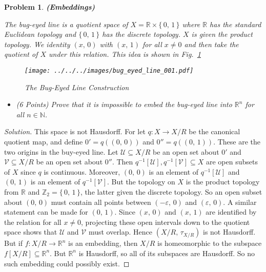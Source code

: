\documentclass{article}
\theoremstyle{normal}
\newtheorem{problem}{Problem}
\begin{document}
    \newpage
    \color{blue}
    \begin{problem}
        \textbf{(Embeddings)}
        \par\hfill\par
        The bug-eyed line is a quotient space of
        $X=\mathbb{R}\times\{\,0,\,1\,\}$ where $\mathbb{R}$ has the standard
        Euclidean topology and $\{\,0,\,1\,\}$ has the discrete topology. $X$
        is given the product topology. We identity
        $(x,\,0)$ with $(x,\,1)$ for all $x\ne{0}$ and then take the quotient
        of $X$ under this relation. This idea is shown in
        Fig.~\ref{fig:bug_eyed_line}
        \begin{figure}
            \centering
            \texttt{[image: ../../../images/bug\_eyed\_line\_001.pdf]}
            \caption{The Bug-Eyed Line Construction}
            \label{fig:bug_eyed_line}
        \end{figure}
        \begin{itemize}
            \item (6 Points) Prove that it is impossible to embed
            the bug-eyed line into $\mathbb{R}^{n}$ for all $n\in\mathbb{N}$.
        \end{itemize}
    \end{problem}
    \color{black}
    \begin{proof}[Solution]
        This space is not Hausdorff. For let $q:X\rightarrow{X}/R$ be the
        canonical quotient map, and define $0'=q((0,\,0))$ and
        $0''=q((0,\,1))$. These are the two origins in the buy-eyed line.
        Let $\mathcal{U}\subseteq{X}/R$ be an open set about $0'$ and
        $\mathcal{V}\subseteq{X}/R$ be an open set about $0''$. Then
        $q^{-1}[\mathcal{U}],q^{-1}[\mathcal{V}]\subseteq{X}$ are open
        subsets of $X$ since $q$ is continuous. Moreover, $(0,\,0)$ is an
        element of $q^{-1}[\mathcal{U}]$ and $(0,\,1)$ is an element of
        $q^{-1}[\mathcal{V}]$. But the topology on $X$ is the product topology
        from $\mathbb{R}$ and $\mathbb{Z}_{2}=\{\,0,\,1\,\}$, the latter given
        the discrete topology. So an open subset about
        $(0,\,0)$ must contain all points between $(-\varepsilon,\,0)$ and
        $(\varepsilon,\,0)$. A similar statement can be made for
        $(0,\,1)$. Since $(x,\,0)$ and $(x,\,1)$ are identified by the relation
        for all $x\ne{0}$, projecting these open intervals down to the quotient
        space shows that $\mathcal{U}$ and $\mathcal{V}$ must overlap.
        Hence $(X/R,\,\tau_{X/R})$ is not Hausdorff. But if
        $f:X/R\rightarrow\mathbb{R}^{n}$ is an embedding, then
        $X/R$ is homeomorphic to the subspace $f[X/R]\subseteq\mathbb{R}^{n}$.
        But $\mathbb{R}^{n}$ is Hausdorff, so all of its subspaces are
        Hausdorff. So no such embedding could possibly exist.
        \par\hfill\par
    \end{proof}
\end{document}
